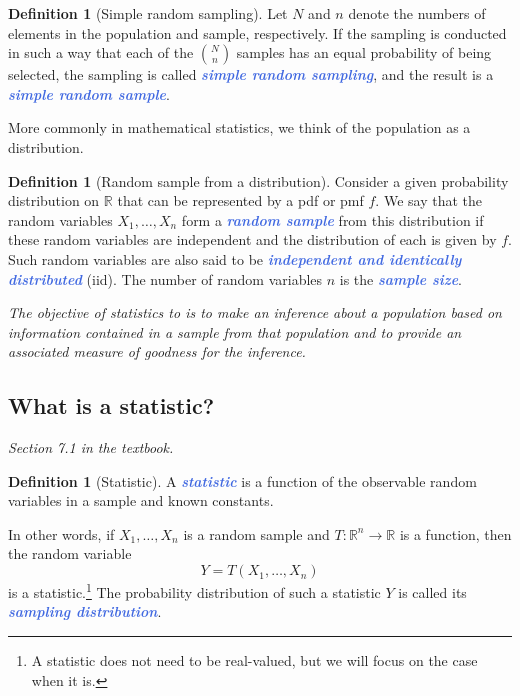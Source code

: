 \documentclass[10pt]{article}
\theoremstyle{definition}
\newtheorem{definition}[theorem]{Definition}
\newcommand{\1}[1]{\textbf{1}_{\left[#1\right]}} %
\def\R{\mathbb{R}} %
\newcommand{\demph}[1]{\textcolor{RoyalBlue}{\textbf{\slshape #1}}} %
\begin{document}
\begin{definition}[Simple random sampling]
  Let $N$ and $n$ denote the numbers of elements in the population and sample,
  respectively. If the sampling is conducted in such a way that each of the
  ${N\choose n}$ samples has an equal probability of being selected, the
  sampling is called \demph{simple random sampling}, and the result is a
  \demph{simple random sample}.
\end{definition}

More commonly in mathematical statistics, we think of the population as a
distribution.

\begin{definition}[Random sample from a distribution]
  Consider a given probability distribution on $\R$ that can be represented by
  a pdf or pmf $f$. We say that the random variables $X_{1},\ldots,X_{n}$ form
  a \demph{random sample} from this distribution if these random variables are
  independent and the distribution of each is given by $f$. Such random
  variables are also said to be \demph{independent and identically
    distributed} (iid). The number of random variables $n$ is the
  \demph{sample size}.
\end{definition}


\textit{The objective of statistics to is to make an inference about a
  population based on information contained in a sample from that population
  and to provide an associated measure of goodness for the inference.}


\subsection{What is a statistic?}
\textit{Section 7.1 in the textbook.}

\begin{definition}[Statistic]
  A \demph{statistic} is a function of the observable random variables in a
  sample and known constants.
\end{definition}

In other words, if $X_{1},\ldots,X_{n}$ is a random sample and
$T:\R^{n}\to \R$ is a function, then the random
variable
\begin{equation*}
  Y = T(X_{1},\ldots,X_{n})
\end{equation*}
is a statistic.\footnote{A statistic does not need to be real-valued, but we
  will focus on the case when it is.} The probability distribution of such a
statistic $Y$ is called its \demph{sampling distribution}.
\end{document}
